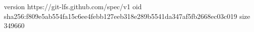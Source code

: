 version https://git-lfs.github.com/spec/v1
oid sha256:f809e5ab554fa15c6ee4febb127eeb318e289b5541da347af5fb2668ec03c019
size 349660
